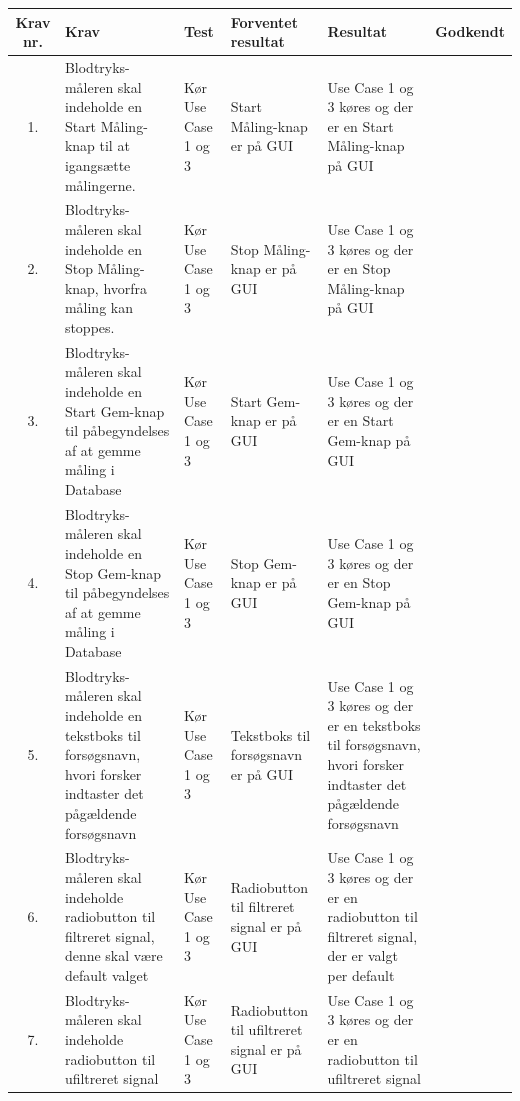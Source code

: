 \begin{longtabu} to 
	Krav nr. & Krav & Test & Forventet resultat & Resultat & Godkendt
	\\[-1ex] \midrule
	
	1. & Blodtryks-måleren skal indeholde en Start Måling-knap til at igangsætte målingerne. & Kør Use Case 1 og 3 & Start Måling-knap er på GUI & Use Case 1 og 3 køres og der er en Start Måling-knap på GUI & {\Huge \checkmark}
	\\ 
	\midrule
	
	2. & Blodtryks-måleren skal indeholde en Stop Måling-knap, hvorfra måling kan stoppes. & Kør Use Case 1 og 3 & Stop Måling-knap er på GUI & Use Case 1 og 3 køres og der er en Stop Måling-knap på GUI & {\Huge \checkmark}
	\\ 
	\midrule
	
	3. & Blodtryks-måleren skal indeholde en Start Gem-knap til påbegyndelses af at gemme måling i Database & Kør Use Case 1 og 3 & Start Gem-knap er på GUI & Use Case 1 og 3 køres og der er en Start Gem-knap på GUI & {\Huge \checkmark}
	\\ 
	\midrule
	
	4. & Blodtryks-måleren skal indeholde en Stop Gem-knap til påbegyndelses af at gemme måling i Database & Kør Use Case 1 og 3 & Stop Gem-knap er på GUI & Use Case 1 og 3 køres og der er en Stop Gem-knap på GUI & {\Huge \checkmark}
	\\ 
	\midrule
	
	5. & Blodtryks-måleren skal indeholde en tekstboks til forsøgsnavn, hvori forsker indtaster det pågældende forsøgsnavn & Kør Use Case 1 og 3 & Tekstboks til forsøgsnavn er på GUI & Use Case 1 og 3 køres og der er en tekstboks til forsøgsnavn, hvori forsker indtaster det pågældende forsøgsnavn  & {\Huge \checkmark}
	\\ 
	\midrule
	
	
	6. & Blodtryks-måleren skal indeholde radiobutton til filtreret signal, denne skal være default valget & Kør Use Case 1 og 3 & Radiobutton til filtreret signal er på GUI & Use Case 1 og 3 køres og der er en radiobutton til filtreret signal, der er valgt per default  &  {\Huge \checkmark}
	\\ 
	\midrule
	
	
	
	7. & Blodtryks-måleren skal indeholde radiobutton til ufiltreret signal & Kør Use Case 1 og 3 & Radiobutton til ufiltreret signal er på GUI & Use Case 1 og 3 køres og der er en radiobutton til ufiltreret signal &  {\Huge \checkmark}
	\\ 
	\midrule
	

\end{longtabu}
